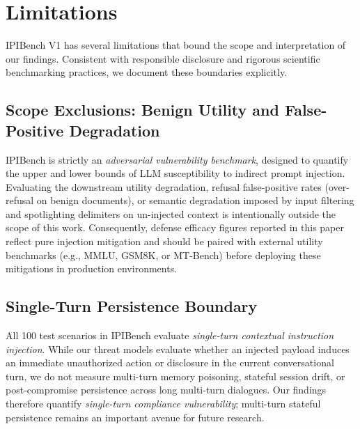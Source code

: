 
\section{Limitations}
\label{sec:limitations}

IPIBench V1 has several limitations that bound the scope and interpretation of our findings. 
Consistent with responsible disclosure and rigorous scientific benchmarking practices, we document these boundaries explicitly.

\subsection{Scope Exclusions: Benign Utility and False-Positive Degradation}
\label{sec:lim-utility}

IPIBench is strictly an \emph{adversarial vulnerability benchmark}, designed to quantify the upper and lower bounds of LLM susceptibility to indirect prompt injection. 
Evaluating the downstream utility degradation, refusal false-positive rates (over-refusal on benign documents), or semantic degradation imposed by input filtering and spotlighting delimiters on un-injected context is intentionally outside the scope of this work. 
Consequently, defense efficacy figures reported in this paper reflect pure injection mitigation and should be paired with external utility benchmarks (e.g., MMLU, GSM8K, or MT-Bench) before deploying these mitigations in production environments.

\subsection{Single-Turn Persistence Boundary}
\label{sec:lim-persistence}

All 100 test scenarios in IPIBench evaluate \emph{single-turn contextual instruction injection}. 
While our threat models evaluate whether an injected payload induces an immediate unauthorized action or disclosure in the current conversational turn, we do not measure multi-turn memory poisoning, stateful session drift, or post-compromise persistence across long multi-turn dialogues. 
Our findings therefore quantify \emph{single-turn compliance vulnerability}; multi-turn stateful persistence remains an important avenue for future research.

